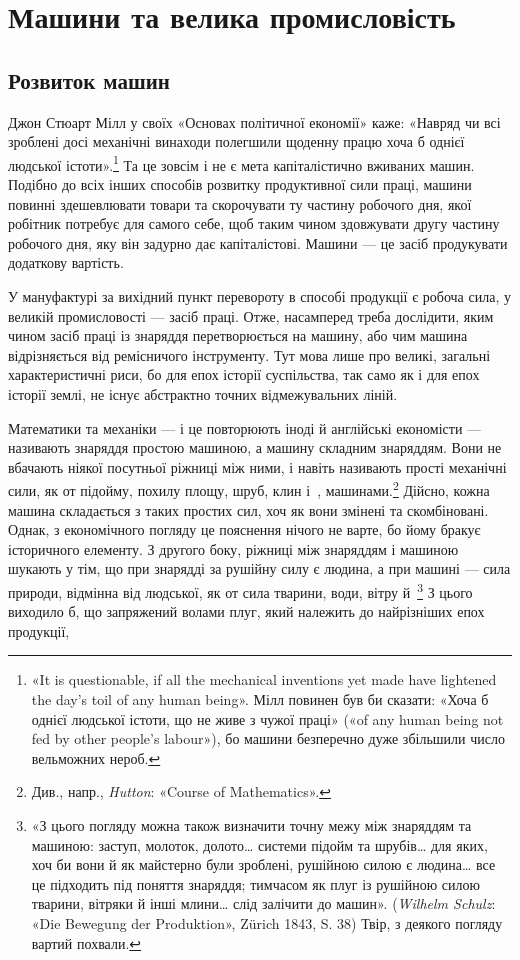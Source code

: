 
\section{Машини та велика промисловість}
\subsection{Розвиток машин}

Джон Стюарт Мілл у своїх «Основах політичної економії»
каже: «Навряд чи всі зроблені досі механічні винаходи полегшили
щоденну працю хоча б однієї людської істоти».\footnote{
«It is questionable, if all the mechanical inventions yet made have
lightened the day’s toil of any human being». Мілл повинен був би сказати:
«Хоча б однієї людської істоти, що не живе з чужої праці» («of any human
being not fed by other people’s labour»), бо машини безперечно дуже збільшили
число вельможних нероб.
} Та це зовсім і не є мета капіталістично вживаних машин. Подібно до
всіх інших способів розвитку продуктивної сили праці, машини
повинні здешевлювати товари та скорочувати ту частину робочого
дня, якої робітник потребує для самого себе, щоб таким
чином здовжувати другу частину робочого дня, яку він задурно
дає капіталістові. Машини — це засіб продукувати додаткову
вартість.

У мануфактурі за вихідний пункт перевороту в способі продукції
є робоча сила, у великій промисловості — засіб праці.
Отже, насамперед треба дослідити, яким чином засіб праці із
знаряддя перетворюється на машину, або чим машина відрізняється
від ремісничого інструменту. Тут мова лише про великі,
загальні характеристичні риси, бо для епох історії суспільства,
так само як і для епох історії землі, не існує абстрактно точних
відмежувальних ліній.

Математики та механіки — і це повторюють іноді й англійські
економісти — називають знаряддя простою машиною, а машину
складним знаряддям. Вони не вбачають ніякої посутньої
ріжниці між ними, і навіть називають прості механічні сили,
як от підойму, похилу площу, шруб, клин і~, машинами.\footnote{
Див., напр., \emph{Hutton}: «Course of Mathematics».
} Дійсно, кожна машина складається з таких простих сил,
хоч як вони змінені та скомбіновані. Однак, з економічного погляду
це пояснення нічого не варте, бо йому бракує історичного
елементу. З другого боку, ріжниці між знаряддям і машиною
шукають у тім, що при знарядді за рушійну силу є людина, а
при машині — сила природи, відмінна від людської, як от сила
тварини, води, вітру й~\footnote{
«З цього погляду можна також визначити точну межу між знаряддям
та машиною: заступ, молоток, долото\dots{} системи підойм та шрубів\dots{}
для яких, хоч би вони й як майстерно були зроблені, рушійною силою є
людина\dots{} все це підходить під поняття знаряддя; тимчасом як плуг із
рушійною силою тварини, вітряки й інші млини\dots{} слід залічити до машин».
(\emph{Wilhelm Schulz}: «Die Bewegung der Produktion», Zürich 1843, S. 38)
Твір, з деякого погляду вартий похвали.
} З цього виходило б, що запряжений
волами плуг, який належить до найрізніших епох продукції,
\parbreak{}  %
